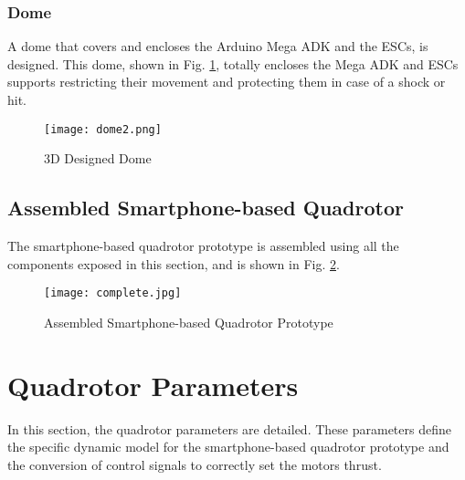 \subsubsection{Dome}
A dome that covers and encloses the Arduino Mega ADK and the ESCs, is designed. This dome, shown in Fig. \ref{fig:dome}, totally encloses the Mega ADK and ESCs supports restricting their movement and protecting them in case of a shock or hit.
\begin{figure}[H]
	\begin{center}
		\texttt{[image: dome2.png]}    
		\caption{3D Designed Dome} 
		\label{fig:dome}
	\end{center}
\end{figure}

\subsection{Assembled Smartphone-based Quadrotor}
The smartphone-based quadrotor prototype is assembled using all the components exposed in this section, and is shown in Fig. \ref{fig:completequad}.
\begin{figure}[H]
	\begin{center}
		\texttt{[image: complete.jpg]}    
		\caption{Assembled Smartphone-based Quadrotor Prototype} 
		\label{fig:completequad}
	\end{center}
\end{figure}

\section{Quadrotor Parameters} \label{sec:parameters}
In this section, the quadrotor parameters are detailed. These parameters define the specific dynamic model for the smartphone-based quadrotor prototype and the conversion of control signals to correctly set the motors thrust.
